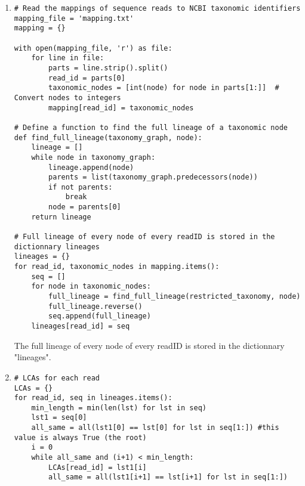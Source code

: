 \documentclass[12 pt,a4paper]{article}
\begin{document}
\begin{enumerate}
\item
{}
\begin{verbatim}
# Read the mappings of sequence reads to NCBI taxonomic identifiers
mapping_file = 'mapping.txt'
mapping = {}

with open(mapping_file, 'r') as file:
    for line in file:
        parts = line.strip().split()
        read_id = parts[0]
        taxonomic_nodes = [int(node) for node in parts[1:]]  # Convert nodes to integers
        mapping[read_id] = taxonomic_nodes

# Define a function to find the full lineage of a taxonomic node
def find_full_lineage(taxonomy_graph, node):
    lineage = []
    while node in taxonomy_graph:
        lineage.append(node)
        parents = list(taxonomy_graph.predecessors(node))
        if not parents:
            break
        node = parents[0]
    return lineage

# Full lineage of every node of every readID is stored in the dictionnary lineages
lineages = {}
for read_id, taxonomic_nodes in mapping.items():
    seq = []
    for node in taxonomic_nodes:
        full_lineage = find_full_lineage(restricted_taxonomy, node)
        full_lineage.reverse()
        seq.append(full_lineage)
    lineages[read_id] = seq
\end{verbatim}
The full lineage of every node of every readID is stored in the dictionnary "lineages".
\item
\begin{verbatim}
# LCAs for each read
LCAs = {}
for read_id, seq in lineages.items():
    min_length = min(len(lst) for lst in seq) 
    lst1 = seq[0]
    all_same = all(lst1[0] == lst[0] for lst in seq[1:]) #this value is always True (the root)
    i = 0
    while all_same and (i+1) < min_length:
        LCAs[read_id] = lst1[i]
        all_same = all(lst1[i+1] == lst[i+1] for lst in seq[1:])


\end{verbatim}
\end{enumerate}
\end{document}
